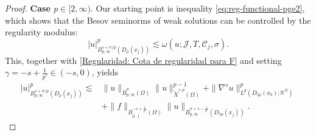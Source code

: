 \documentclass[]{amsart}
\theoremstyle{definition}
\theoremstyle{definition}
\theoremstyle{remark}
\numberwithin{equation}{section}
\newcommand{\grads}{\nabla^{s}}
\begin{document}
\begin{proof}
		\textbf{Case \( p \in [2, \infty). \)}	
        Our starting point is inequality \eqref{eq:reg-functional-pge2}, which shows that the Besov seminorms of weak solutions can be controlled by the regularity modulus:
		\[
		|u|_{B_{p,\infty}^{s+\sigma/p}(D_\rho(x_j))}^p \lesssim \omega(u;\mathcal{J},T,\mathcal{C}_j,\sigma).
		\]
		This, together with \eqref{Regularidad: Cota de regularidad para F} and setting $\gamma = -s + \frac1{p'} \in (-s,0)$, yields
        \[ \begin{split}
		|u|_{B_{p, \infty}^{s+\sigma / p}\left(D_\rho\left(x_j \right)\right)}^p \lesssim &\|u\|_{\dot{B}^{\sigma}_{p,\infty}(\Omega)}\|u\|^{p-1}_{\widetilde{X}^{s,p}(\Omega)}+\|\grads u\|^{p}_{L^{p}(D_{3\rho}(x_0); \mathbb{R}^N)}  \\
        & +\|f\|_{B_{p^{\prime}, 1}^{-s + \frac1{p'}}\left(\Omega\right)}\|u\|_{B_{p, \infty}^{\sigma+s - \frac1{p'}}\left(D_{3 \rho}\left(x_{j}\right)\right)}.
		\end{split}\]
		

\end{proof}
\end{document}
